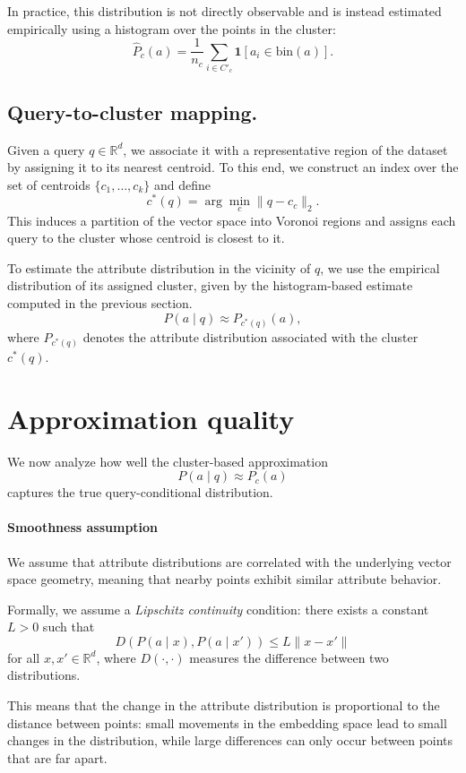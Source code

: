 In practice, this distribution is not directly observable and is instead
estimated empirically using a histogram over the points in the cluster:
\[
\hat{P}_c(a) = \frac{1}{n_c} \sum_{i \in C'_c} \mathbf{1}[a_i \in \text{bin}(a)].
\]

\subsection{Query-to-cluster mapping.}
Given a query \(q \in \mathbb{R}^d\), we associate it with a representative
region of the dataset by assigning it to its nearest centroid. To this end, we
construct an index over the set of centroids \(\{c_1, \dots, c_k\}\) and define
\[
c^*(q) = \arg\min_c \|q - c_c\|_2.
\]
This induces a partition of the vector space into Voronoi regions and assigns
each query to the cluster whose centroid is closest to it.

To estimate the attribute distribution in the vicinity of \(q\), we use the
empirical distribution of its assigned cluster, given by the histogram-based
estimate computed in the previous section. 
\[
P(a \mid q) \approx P_{c^*(q)}(a),
\]
where \(P_{c^*(q)}\) denotes the attribute distribution associated with the
cluster \(c^*(q)\). 

\section{Approximation quality}\label{sec:approximation-quality}
We now analyze how well the cluster-based approximation
\[
P(a \mid q) \approx P_c(a)
\]
captures the true query-conditional distribution.

\paragraph{Smoothness assumption}
We assume that attribute distributions are correlated with the underlying
vector space geometry, meaning that nearby points exhibit similar attribute
behavior. 

Formally, we assume a \emph{Lipschitz continuity} condition: there exists a
constant \(L > 0\) such that
\[
D(P(a \mid x), P(a \mid x')) \le L \|x - x'\|
\]
for all \(x, x' \in \mathbb{R}^d\), where \(D(\cdot,\cdot)\) measures the
difference between two distributions.

This means that the change in the attribute distribution is proportional to the
distance between points: small movements in the embedding space lead to small
changes in the distribution, while large differences can only occur between
points that are far apart.

